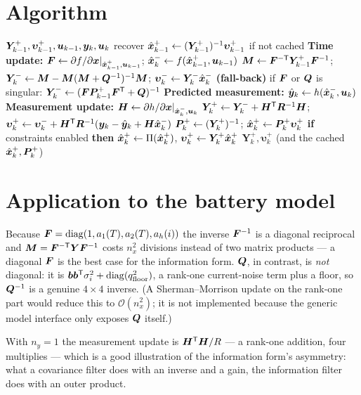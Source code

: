 \section{Algorithm}
\begin{algorithm}[H]
\caption{EIF --- one sampling period}
\begin{algorithmic}[1]
\Require $\bm{Y}^+_{k-1},\bm\upsilon^+_{k-1},\bm{u}_{k-1},\bm{y}_k,\bm{u}_k$
\State recover $\hat{\bm{x}}^{+}_{k-1}\gets(\bm{Y}^+_{k-1})^{-1}\bm\upsilon^+_{k-1}$ if not cached
\State \textbf{Time update:} $\bm{F}\gets\partial f/\partial\bm{x}|_{\hat{\bm{x}}^{+}_{k-1},\bm{u}_{k-1}}$;\;
       $\hat{\bm{x}}^{-}_k\gets f(\hat{\bm{x}}^{+}_{k-1},\bm{u}_{k-1})$
\State $\bm{M}\gets\bm{F}^{-\mathsf{T}}\bm{Y}^+_{k-1}\bm{F}^{-1}$;\;
       $\bm{Y}^-_k\gets\bm{M}-\bm{M}(\bm{M}+\bm{Q}^{-1})^{-1}\bm{M}$;\;
       $\bm\upsilon^-_k\gets\bm{Y}^-_k\hat{\bm{x}}^{-}_k$
\State \textbf{(fall-back)} if $\bm{F}$ or $\bm{Q}$ is singular: $\bm{Y}^-_k\gets(\bm{F}\bm{P}^{+}_{k-1}\bm{F}^{\mathsf{T}}+\bm{Q})^{-1}$
\State \textbf{Predicted measurement:} $\hat{\bm{y}}_k\gets h(\hat{\bm{x}}^{-}_k,\bm{u}_k)$
\State \textbf{Measurement update:} $\bm{H}\gets\partial h/\partial\bm{x}|_{\hat{\bm{x}}^{-}_k,\bm{u}_k}$
\State $\bm{Y}^+_k\gets\bm{Y}^-_k+\bm{H}^{\mathsf{T}}\bm{R}^{-1}\bm{H}$;\;
       $\bm\upsilon^+_k\gets\bm\upsilon^-_k+\bm{H}^{\mathsf{T}}\bm{R}^{-1}(\bm{y}_k-\hat{\bm{y}}_k+\bm{H}\hat{\bm{x}}^{-}_k)$
\State $\bm{P}^{+}_k\gets(\bm{Y}^+_k)^{-1}$;\; $\hat{\bm{x}}^{+}_k\gets\bm{P}^{+}_k\bm\upsilon^+_k$
\State \textbf{if} constraints enabled \textbf{then} $\hat{\bm{x}}^{+}_k\gets\Pi(\hat{\bm{x}}^{+}_k)$, $\bm\upsilon^+_k\gets\bm{Y}^+_k\hat{\bm{x}}^{+}_k$
\Ensure $\bm{Y}^+_k,\bm\upsilon^+_k$ (and the cached $\hat{\bm{x}}^{+}_k,\bm{P}^{+}_k$)
\end{algorithmic}
\end{algorithm}

\section{Application to the battery model}
Because $\bm{F}=\operatorname{diag}(1,a_1(T),a_2(T),a_h(i))$ the inverse $\bm{F}^{-1}$ is a diagonal reciprocal and
$\bm{M} = \bm{F}^{-\mathsf{T}}\bm{Y}\bm{F}^{-1}$ costs $n_x^2$ divisions instead of two matrix products --- a
diagonal $\bm{F}$ is the best case for the information form. $\bm{Q}$, in contrast, is
\emph{not} diagonal: it is $\bm b\bm b^{\mathsf{T}}\sigma_i^2 + \operatorname{diag}(q_{\text{floor}}^2)$, a rank-one
current-noise term plus a floor, so $\bm{Q}^{-1}$ is a genuine $4\times4$ inverse. (A
Sherman--Morrison update on the rank-one part would reduce this to $\mathcal{O}(n_x^2)$; it is
not implemented because the generic model interface only exposes $\bm{Q}$ itself.)

With $n_y=1$ the measurement update is $\bm{H}^{\mathsf{T}}\bm{H}/R$ --- a rank-one addition, four multiplies
--- which is a good illustration of the information form's asymmetry: what a covariance filter
does with an inverse and a gain, the information filter does with an outer product.

